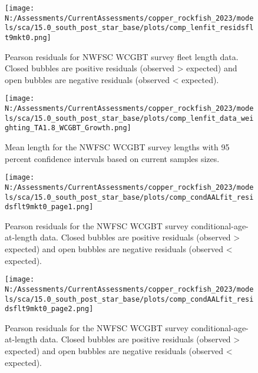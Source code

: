 \documentclass[11pt,
  english,
  letterpaper,
]{article}
\begin{document}
\pagebreak

\begin{figure}
\centering
\texttt{[image: N:/Assessments/CurrentAssessments/copper\_rockfish\_2023/models/sca/15.0\_south\_post\_star\_base/plots/comp\_lenfit\_residsflt9mkt0.png]}
\caption{Pearson residuals for NWFSC WCGBT survey fleet length data. Closed bubbles are positive residuals (observed \textgreater{} expected) and open bubbles are negative residuals (observed \textless{} expected).\label{fig:wcgbt-len-pearson}}
\end{figure}

\pagebreak

\begin{figure}
\centering
\texttt{[image: N:/Assessments/CurrentAssessments/copper\_rockfish\_2023/models/sca/15.0\_south\_post\_star\_base/plots/comp\_lenfit\_data\_weighting\_TA1.8\_WCGBT\_Growth.png]}
\caption{Mean length for the NWFSC WCGBT survey lengths with 95 percent confidence intervals based on current samples sizes.\label{fig:wcgbt-mean-len-fit}}
\end{figure}

\pagebreak

\begin{figure}
\centering
\texttt{[image: N:/Assessments/CurrentAssessments/copper\_rockfish\_2023/models/sca/15.0\_south\_post\_star\_base/plots/comp\_condAALfit\_residsflt9mkt0\_page1.png]}
\caption{Pearson residuals for the NWFSC WCGBT survey conditional-age-at-length data. Closed bubbles are positive residuals (observed \textgreater{} expected) and open bubbles are negative residuals (observed \textless{} expected).\label{fig:wcgbt-age-pearson-1}}
\end{figure}

\pagebreak

\begin{figure}
\centering
\texttt{[image: N:/Assessments/CurrentAssessments/copper\_rockfish\_2023/models/sca/15.0\_south\_post\_star\_base/plots/comp\_condAALfit\_residsflt9mkt0\_page2.png]}
\caption{Pearson residuals for the NWFSC WCGBT survey conditional-age-at-length data. Closed bubbles are positive residuals (observed \textgreater{} expected) and open bubbles are negative residuals (observed \textless{} expected).\label{fig:wcgbt-age-pearson-2}}
\end{figure}

\pagebreak
\end{document}
